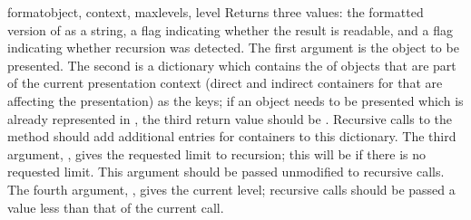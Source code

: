 \begin{methoddesc}{format}{object, context, maxlevels, level}
Returns three values: the formatted version of  as a
string, a flag indicating whether the result is readable, and a flag
indicating whether recursion was detected.  The first argument is the
object to be presented.  The second is a dictionary which contains the
 of objects that are part of the current presentation
context (direct and indirect containers for  that are
affecting the presentation) as the keys; if an object needs to be
presented which is already represented in , the third
return value should be .  Recursive calls to the 
method should add additional entries for containers to this
dictionary.  The third argument, , gives the requested
limit to recursion; this will be  if there is no requested
limit.  This argument should be passed unmodified to recursive calls.
The fourth argument, , gives the current level; recursive
calls should be passed a value less than that of the current call.
\end{methoddesc}
